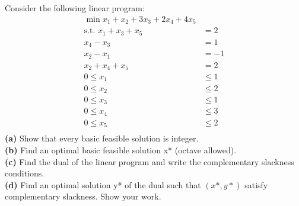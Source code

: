 \documentclass[fleqn]{homework}
\begin{document}
  \begin{problem}{5}
    \begin{question}
      Consider the following linear program:
      \begin{align*}
        \min x_1 + x_2 + 3x_3 + 2x_4 + 4x_5 & \\
        \text{s.t. } x_1 + x_3 + x_5 &= 2 \\
        x_4 - x_3 &= 1 \\
        x_2 - x_1 &= -1 \\
        x_2 + x_4 + x_5 &= 2 \\
        0 \le x_1 &\le 1 \\
        0 \le x_2 &\le 2 \\
        0 \le x_3 &\le 1 \\
        0 \le x_4 &\le 3 \\
        0 \le x_5 &\le 2 \\
      \end{align*}
      \textbf{(a)} Show that every basic feasible solution is integer.\\
      \textbf{(b)} Find an optimal basic feasible solution x* (octave allowed).\\
      \textbf{(c)} Find the dual of the linear program and write the
      complementary slackness conditions.\\
      \textbf{(d)} Find an optimal solution y* of the dual such that $(x*, y*)$
      satisfy complementary slackness. Show your work.\\
    \end{question}
  \end{problem}
\end{document}
